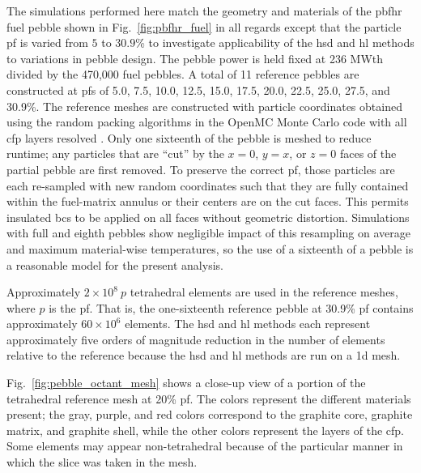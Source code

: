 The simulations performed here match the geometry and materials of the \gls{pbfhr} fuel pebble shown in Fig.\ \ref{fig:pbfhr_fuel} in all regards except that the particle \gls{pf} is varied from \(5\) to \(30.9\)\% to investigate applicability of the \gls{hsd} and \gls{hl} methods to variations in pebble design. The pebble power is held fixed at 236 MWth divided by the 470,000 fuel pebbles. A total of 11 reference pebbles are constructed at \glspl{pf} of 5.0, 7.5, 10.0, 12.5, 15.0, 17.5, 20.0, 22.5, 25.0, 27.5, and 30.9\%. The reference meshes are constructed with particle coordinates obtained using the random packing algorithms in the OpenMC Monte Carlo code with all \gls{cfp} layers resolved \cite{jodrey}. Only one sixteenth of the pebble is meshed to reduce runtime; any particles that are ``cut'' by the \(x=0\), \(y=x\), or \(z=0\) faces of the partial pebble are first removed. To preserve the correct \gls{pf}, those particles are each re-sampled with new random coordinates such that they are fully contained within the fuel-matrix annulus or their centers are on the cut faces. This permits insulated \glspl{bc} to be applied on all faces without geometric distortion. Simulations with full and eighth pebbles show negligible impact of this resampling on average and maximum material-wise temperatures, so the use of a sixteenth of a pebble is a reasonable model for the present analysis. 

Approximately \(2\times10^8\ p\) tetrahedral elements are used in the reference meshes, where \(p\) is the \gls{pf}. That is, the one-sixteenth reference pebble at 30.9\% \gls{pf} contains approximately \(60\times10^6\) elements. The \gls{hsd} and \gls{hl} methods each represent approximately five orders of magnitude reduction in the number of elements relative to the reference because the \gls{hsd} and \gls{hl} methods are run on a \gls{1d} mesh.

Fig.\ \ref{fig:pebble_octant_mesh} shows a close-up view of a portion of the tetrahedral reference mesh at 20\% \gls{pf}. The colors represent the different materials present; the gray, purple, and red colors correspond to the graphite core, graphite matrix, and graphite shell, while the other colors represent the layers of the \gls{cfp}. Some elements may appear non-tetrahedral because of the particular manner in which the slice was taken in the mesh.

